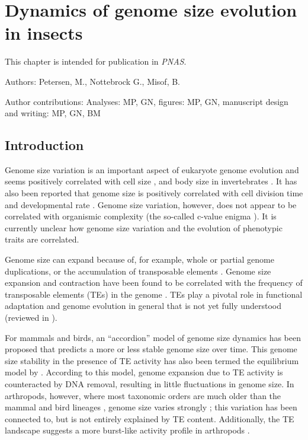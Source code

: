 
\chapter{Dynamics of genome size evolution in insects}
\label{cha:dynamics}
This chapter is intended for publication in \emph{PNAS}.

Authors: Petersen, M., Nottebrock G., Misof, B. 

Author contributions: Analyses: MP, GN, figures: MP, GN, manuscript
design and writing: MP, GN, BM

\section{Introduction}

Genome size variation is an important aspect of eukaryote genome
evolution \citep{Gregory2005,Petrov2001} and seems positively correlated with cell
size \citep{Dufresne2011}, and body size in invertebrates
\citep{Gregory2008}. It has also been reported that genome size is
positively correlated with cell division time \citep{Bennett1977} and
developmental rate \citep{White2000}. Genome size variation, however,
does not appear to be correlated with organismic complexity (the
so-called c-value enigma \citep{Gregory2008}). It is currently unclear
how genome size variation and the evolution of phenotypic traits are
correlated.

Genome size can expand because of, for example, whole or partial genome
duplications, or the accumulation of transposable elements
\citep{Bennetzen2005,Piegu2006,Vitte2007,Kelly2015,Nystedt2013,Blass2012,Neafsey2003,Sun2012,Sato2010,Marburger2018,Kapusta2017a}. Genome size expansion and contraction have been
found to be correlated with the frequency of transposable elements (TEs)
in the genome \citep{Sotero-Caio2017,Kapusta2017a,Petrov1996,Petrov2000}. TEs play a pivotal role in functional
adaptation and genome evolution in general that is not yet fully
understood (reviewed in \citet{Maumus2015,Arkhipova2018}).

For mammals and birds, an ``accordion'' model of genome size dynamics
has been proposed \citet{Kapusta2017a} that predicts a more or less
stable genome size over time. This genome size stability in the presence
of TE activity has also been termed the equilibrium model by
\citet{Charlesworth1983}. According to this model, genome expansion due to TE
activity is counteracted by DNA removal, resulting in little
fluctuations in genome size. In arthropods, however, where most
taxonomic orders are much older than the mammal and bird lineages
\citep{Misof2014}, genome size varies strongly \citep{Alfsnes2017,Petersen2019};
this variation has been connected to, but is not entirely explained by
TE content. Additionally, the TE landscape suggests a more burst-like
activity profile in arthropods \citep{Petersen2019}.

